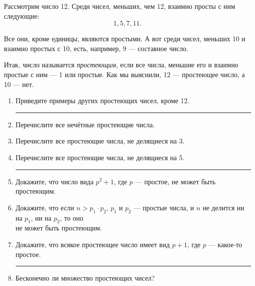 ﻿
\def\lne{\medskip \\ \rule{0.65\textwidth}{0.028cm}}

\noindent Рассмотрим число 12. Среди чисел, меньших, чем 12, взаимно просты с ним следующие:
\vspace{-0.2cm}
$$1, 5, 7, 11.$$

\vspace{-0.2cm}
\noindent Все они, кроме единицы, являются простыми. А вот среди чисел, меньших 10 и взаимно простых с 10, есть, например, 9 — составное число.

\ms Итак, число называется {\it простеющим}, если все числа, меньшие его и взаимно простые с ним — 1 или простые. Как мы выяснили, 12 — простеющее число, а 10 — нет.

\begin{enumerate}

\vspace{0.25cm}
\item Приведите примеры других простеющих чисел, кроме 12.
\lne

\item Перечислите все нечётные простеющие числа.
\item Перечислите все простеющие числа, не делящиеся на 3.
\item Перечислите все простеющие числа, не делящиеся на 5.
\lne

\item Докажите, что число вида $p^2 + 1$, где $p$ — простое, не может быть простеющим.
\item Докажите, что если $n > p_1 \cdot p_2$, $p_1$ и $p_2$ — простые числа, и $n$ не делится ни на $p_1$, ни на $p_2$, то оно \\ не может быть простеющим.
\item Докажите, что всякое простеющее число имеет вид $p+1$, где $p$ — какое-то простое.
\lne

\item Бесконечно ли множество простеющих чисел?
\end{enumerate}